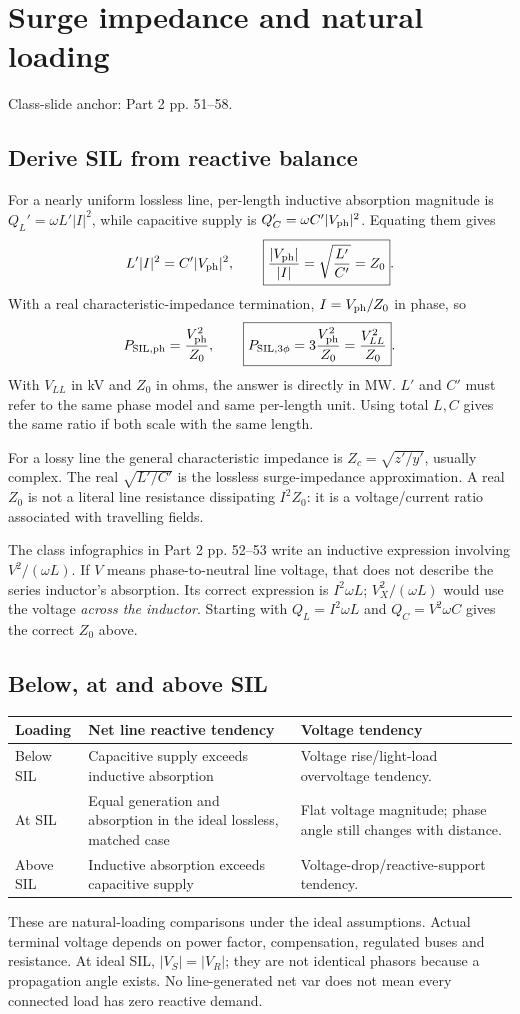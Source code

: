 \documentclass[11pt,a4paper]{article}
\newenvironment{Caution}[1]{\begin{tcolorbox}[colback=warm,colframe=rust,coltitle=white,title={#1}]}{\end{tcolorbox}}
\newcommand{\slides}[1]{{\small\color{muted}\textsf{Class-slide anchor: #1.}}\par}
\newcommand{\chapterstart}[2]{\clearpage\section{#1}\label{#2}}
\newcommand{\ans}[1]{\boxed{#1}}
\begin{document}
\chapterstart{Surge impedance and natural loading}{sil}
\slides{Part 2 pp. 51--58}
\subsection{Derive SIL from reactive balance}
For a nearly uniform lossless line, per-length inductive absorption magnitude is $Q_L'=\omega L'|I|^2$, while capacitive supply is $Q_C'=\omega C'|V_{\rm ph}|^2$. Equating them gives
\[
 L'|I|^2=C'|V_{\rm ph}|^2,\qquad
 \ans{\frac{|V_{\rm ph}|}{|I|}=\sqrt{\frac{L'}{C'}}=Z_0}.
\]
With a real characteristic-impedance termination, $I=V_{\rm ph}/Z_0$ in phase, so
\[
 P_{\rm SIL,ph}=\frac{V_{\rm ph}^2}{Z_0},\qquad
 \ans{P_{\rm SIL,3\phi}=3\frac{V_{\rm ph}^2}{Z_0}=\frac{V_{LL}^2}{Z_0}}.
\]
With $V_{LL}$ in kV and $Z_0$ in ohms, the answer is directly in MW. $L'$ and $C'$ must refer to the same phase model and same per-length unit. Using total $L,C$ gives the same ratio if both scale with the same length.

For a lossy line the general characteristic impedance is $Z_c=\sqrt{z'/y'}$, usually complex. The real $\sqrt{L'/C'}$ is the lossless surge-impedance approximation. A real $Z_0$ is not a literal line resistance dissipating $I^2Z_0$: it is a voltage/current ratio associated with travelling fields.

\begin{Caution}{Which voltage appears across the line inductor?}
The class infographics in Part 2 pp. 52--53 write an inductive expression involving $V^2/(\omega L)$. If $V$ means phase-to-neutral line voltage, that does not describe the series inductor's absorption. Its correct expression is $I^2\omega L$; $V_X^2/(\omega L)$ would use the voltage \emph{across the inductor}. Starting with $Q_L=I^2\omega L$ and $Q_C=V^2\omega C$ gives the correct $Z_0$ above.
\end{Caution}
\subsection{Below, at and above SIL}
\begin{center}\small
\begin{tabularx}{\textwidth}{L{2.9cm}YY}
\toprule\textbf{Loading} & \textbf{Net line reactive tendency} & \textbf{Voltage tendency}\\\midrule
Below SIL & Capacitive supply exceeds inductive absorption & Voltage rise/light-load overvoltage tendency.\\
At SIL & Equal generation and absorption in the ideal lossless, matched case & Flat voltage magnitude; phase angle still changes with distance.\\
Above SIL & Inductive absorption exceeds capacitive supply & Voltage-drop/reactive-support tendency.\\\bottomrule
\end{tabularx}\end{center}
These are natural-loading comparisons under the ideal assumptions. Actual terminal voltage depends on power factor, compensation, regulated buses and resistance. At ideal SIL, $|V_S|=|V_R|$; they are not identical phasors because a propagation angle exists. No line-generated net var does not mean every connected load has zero reactive demand.
\end{document}
